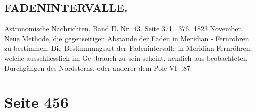 \documentclass[10pt,a4paper]{article}
\begin{document}
\subsection*{FADENINTERVALLE.}

Astronomische  Nachrichten.    Band  IL  Nr.  43.  Seite  371.. 376.     1823  November.
Neue  Methode,  die  gegenseitigen  Abstände  der  Fäden  in  Meridian  -  Fernröhren  zu  bestimmen.
Die  Bestimmungsart  der  Fadenintervalle  in  Meridian-Fernröhren,   welche   ausschliesslich  im  Ge-
brauch zu  sein  scheint,  nemlich  aus  beobachteten  Durchgängen  des  Nordsterns,  oder  anderer  dem  Pole
VI.  .87

\newpage
\section*{Seite 456}
\end{document}
